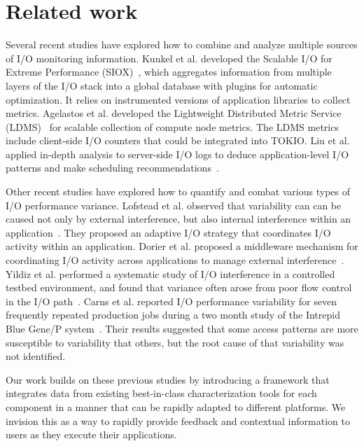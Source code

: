 \section{Related work} \label{sec:related}

Several recent studies have explored how to combine
and analyze multiple sources of I/O monitoring information.
Kunkel et al. developed the Scalable I/O for Extreme Performance
(SIOX)~\cite{Kunkel:2014:SAC:2769884.2769901}, which aggregates
information from multiple layers of the I/O stack into a global database
with plugins for automatic optimization.  It relies on instrumented
versions of application libraries to collect metrics.  Agelastos et al.
developed the Lightweight Distributed Metric Service (LDMS)~\cite{7013000}
for scalable collection of compute node metrics. The LDMS metrics include
client-side I/O counters that could be integrated into TOKIO.  Liu et al. applied in-depth
analysis to server-side I/O logs to deduce application-level I/O patterns
and make scheduling recommendations~\cite{Liu2016}.

Other recent studies have explored how to quantify and combat various
types of I/O performance variance.  Lofstead et al. observed that
variability can can be caused not only by external interference, but also
internal interference within an application~\cite{lofstead2010managing}.
They proposed an adaptive I/O strategy that coordinates I/O activity
within an application.  Dorier et al. proposed a middleware mechanism
for coordinating I/O activity across applications to manage external
interference~\cite{dorier2014calciom}.  Yildiz et al. performed a
systematic study of I/O interference in a controlled testbed environment,
and found that variance often arose from poor flow control in the I/O
path~\cite{Yildiz2016}.  Carns et al. reported I/O performance variability
for seven frequently repeated production jobs during a two month study
of the Intrepid Blue Gene/P system~\cite{carns2011understanding}.
Their results suggested that some access patterns are more susceptible
to variability that others, but the root cause of that variability was
not identified.

Our work builds on these previous studies by introducing a framework that
integrates data from existing best-in-class characterization tools for each
component in a manner that can be rapidly adapted to different platforms.  We
invision this as a way to rapidly provide feedback and contextual information to
users as they execute their applications.

